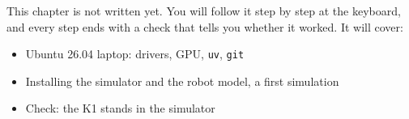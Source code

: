 \label{k:ws}
\begin{keyidea}
This chapter is not written yet. You will follow it step by step at the keyboard, and every step ends with a check that tells you whether it worked. It will cover:
\begin{itemize}[nosep]
  \item Ubuntu 26.04 laptop: drivers, GPU, \texttt{uv}, \texttt{git}
  \item Installing the simulator and the robot model, a first simulation
  \item Check: the K1 stands in the simulator
\end{itemize}
\end{keyidea}
